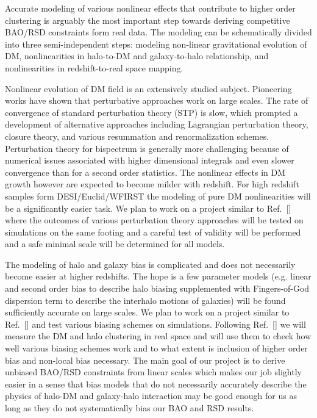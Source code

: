 Accurate modeling of various nonlinear effects that contribute to higher order
clustering is arguably the most important step towards deriving competitive
BAO/RSD constraints form real data. The modeling can be schematically divided
into three semi-independent steps: modeling non-linear gravitational evolution
of DM, nonlinearities in halo-to-DM and galaxy-to-halo relationship, and
nonlinearities in redshift-to-real space mapping.

Nonlinear evolution of DM field is an extensively studied subject. Pioneering
works have shown that perturbative approaches work on large scales. The rate of
convergence of standard perturbation theory (STP) is slow, which prompted a
development of alternative approaches including Lagrangian perturbation theory,
closure theory, and various resummation and renormalization schemes.
Perturbation theory for bispectrum is generally more challenging because of
numerical issues associated with higher dimensional integrals and even slower
convergence than for a second order statistics. The nonlinear effects in DM
growth however are expected to become milder with redshift. For high redshift
samples form DESI/Euclid/WFIRST the modeling of pure DM nonlinearities will be
a significantly easier task. We plan to work on a project similar to Ref.~[]
where the outcomes of various perturbation theory approaches will be tested on
simulations on the same footing and a careful test of validity will be
performed and a safe minimal scale will be determined for all models.

The modeling of halo and galaxy bias is complicated and does not necessarily
become easier at higher redshifts. The hope is a few parameter models (e.g.
linear and second order bias to describe halo biasing supplemented with
Fingers-of-God dispersion term to describe the interhalo motions of galaxies)
will be found sufficiently accurate on large scales. We plan to work on a
project similar to Ref.~[] and test various biasing schemes on simulations.
Following Ref.~[] we will measure the DM and halo clustering in real space and
will use them to check how well various biasing schemes work and to what extent
is inclusion of higher order bias and non-local bias necessary. The main goal
of our project is to derive unbiased BAO/RSD constraints from linear scales
which makes our job slightly easier in a sense that bias models that do not
necessarily accurately describe the physics of halo-DM and galaxy-halo
interaction may be good enough for us as long as they do not systematically
bias our BAO and RSD results.

